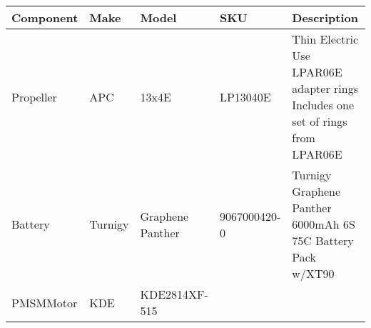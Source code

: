 \begin{tabular}{lllll}
Component & Make & Model & SKU & Description \\ 
\hline 
Propeller & APC & 13x4E & LP13040E & Thin Electric Use LPAR06E adapter rings Includes one set of rings from LPAR06E \\ 
Battery & Turnigy & Graphene Panther & 9067000420-0 & Turnigy Graphene Panther 6000mAh 6S 75C Battery Pack w/XT90 \\ 
PMSMMotor & KDE & KDE2814XF-515 &  &  \\ 
\hline 
\end{tabular}